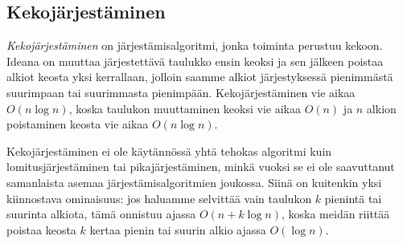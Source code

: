 \subsection{Kekojärjestäminen}

\emph{Kekojärjestäminen} on järjestämisalgoritmi,
jonka toiminta perustuu kekoon.
Ideana on muuttaa järjestettävä taulukko ensin keoksi
ja sen jälkeen poistaa alkiot keosta yksi kerrallaan,
jolloin saamme alkiot järjestyk\-sessä pienimmästä suurimpaan
tai suurimmasta pienimpään.
Kekojärjestäminen vie aikaa $O(n \log n)$,
koska taulukon muuttaminen keoksi vie aikaa $O(n)$
ja $n$ alkion poistaminen keosta vie aikaa $O(n \log n)$.

Kekojärjestäminen ei ole käytännössä yhtä tehokas algoritmi
kuin lomitusjärjestäminen tai pikajärjestäminen,
minkä vuoksi se ei ole saavuttanut samanlaista asemaa
järjestämisalgoritmien joukossa.
Siinä on kuitenkin yksi kiinnostava ominaisuus:
jos haluamme selvittää vain taulukon $k$ pienintä tai suurinta
alkiota, tämä onnistuu ajassa $O(n+k \log n)$,
koska meidän riittää poistaa keosta $k$ kertaa
pienin tai suurin alkio ajassa $O(\log n)$.